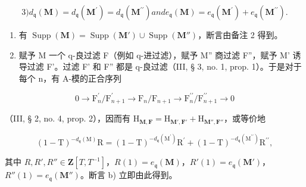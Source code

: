 \[
3) d _ {\mathfrak {q}} (\mathbf {M}) = d _ {\mathfrak {q}} \left(\mathbf {M} ^ {\prime}\right) = d _ {\mathfrak {q}} \left(\mathbf {M} ^ {\prime \prime}\right) and e _ {\mathfrak {q}} (\mathbf {M}) = e _ {\mathfrak {q}} \left(\mathbf {M} ^ {\prime}\right) + e _ {\mathfrak {q}} \left(\mathbf {M} ^ {\prime \prime}\right).
\]

\begin{enumerate}
\def\labelenumi{\alph{enumi})}
\item
  有 \(\operatorname{Supp}(\mathbf{M}) = \operatorname{Supp}(\mathbf{M}') \cup \operatorname{Supp}(\mathbf{M}'')\)，断言由备注 2 得到。
\item
  赋予 M 一个 q-良过滤 F（例如 q-进过滤），赋予 M'' 商过滤 F''，赋予 M' 诱导过滤 F'。过滤 F' 和 F'' 都是 q-良过滤（III, § 3, no. 1, prop. 1）。于是对于每个 n，有 A-模的正合序列
\end{enumerate}

\[
0 \rightarrow \mathrm{F} _ {n} ^ {\prime} / \mathrm{F} _ {n + 1} ^ {\prime} \rightarrow \mathrm{F} _ {n} / \mathrm{F} _ {n + 1} \rightarrow \mathrm{F} _ {n} ^ {\prime \prime} / \mathrm{F} _ {n + 1} ^ {\prime \prime} \rightarrow 0
\]

（III, § 2, no. 4, prop. 2），因而有 \(\mathrm{H}_{\mathbf{M},\mathbf{F}} = \mathrm{H}_{\mathbf{M}',\mathbf{F}'} + \mathrm{H}_{\mathbf{M}'',\mathbf{F}''}\)，或等价地

\[
(1 - \mathrm{T}) ^ {- d _ {\mathfrak {q}} (\mathrm{M})} \mathrm{R} = (1 - \mathrm{T}) ^ {- d _ {\mathfrak {q}} (\mathrm{M} ^ {\prime})} \mathrm{R} ^ {\prime} + (1 - \mathrm{T}) ^ {- d _ {\mathfrak {q}} (\mathrm{M} ^ {\prime \prime})} \mathrm{R} ^ {\prime \prime},
\]

其中 \(R,R',R''\in\mathbf{Z}[T,T^{-1}]\)，\(R(1)=e_{\mathfrak{q}}(\mathbf{M})\)，\(R'(1)=e_{\mathfrak{q}}(\mathbf{M}')\)，\(R''(1)=e_{\mathfrak{q}}(\mathbf{M}'')\)。断言 b) 立即由此得到。

